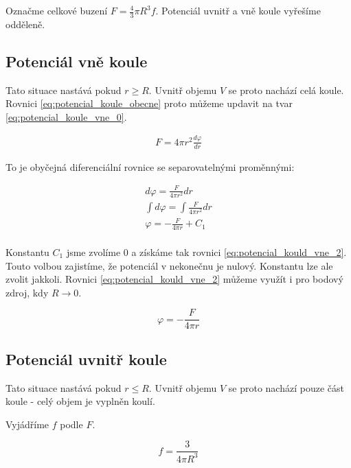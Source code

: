 \documentclass{book}
\begin{document}
Označme celkové buzení \(F = \frac{4}{3} \pi R^3 f\).
Potenciál uvnitř a vně koule vyřešíme odděleně.

\subsection{Potenciál vně koule}

Tato situace nastává pokud \(r \geq R\). Uvnitř objemu \(V\) se proto nachází celá koule. Rovnici \eqref{eq:potencial_koule_obecne} proto můžeme updavit na tvar \eqref{eq:potencial_koule_vne_0}.

\begin{equation}
\label{eq:potencial_koule_vne_0}
\begin{split}
F = 4 \pi r^2 \frac{d \varphi}{dr}
\end{split}
\end{equation}

To je obyčejná diferenciální rovnice se separovatelnými proměnnými:

\begin{equation}
\label{eq:potencial_koule_vne_1}
\begin{split}
d \varphi = \frac{F}{4 \pi r^2} dr \\
\int d \varphi = \int \frac{F}{4 \pi r^2} dr \\
\varphi = -\frac{F}{4 \pi r} + C_1 \\
\end{split}
\end{equation}

Konstantu \(C_1\) jsme zvolíme 0 a získáme tak rovnici \eqref{eq:potencial_kould_vne_2}. Touto volbou zajistíme, že potenciál v nekonečnu je nulový. Konstantu lze ale zvolit jakkoli. Rovnici \eqref{eq:potencial_kould_vne_2} můžeme využít i pro bodový zdroj, kdy \(R \rightarrow 0\).

\begin{equation}
\label{eq:potencial_koule_vne_2}
\varphi = -\frac{F}{4 \pi r}
\end{equation}

\subsection{Potenciál uvnitř koule}

Tato situace nastává pokud \(r \leq R\). Uvnitř objemu \(V\) se proto nachází pouze část koule - celý objem je vyplněn koulí.

Vyjádříme \(f\) podle \(F\).

\begin{equation}
f = \frac{3}{4 \pi R^3}
\end{equation}
\end{document}
